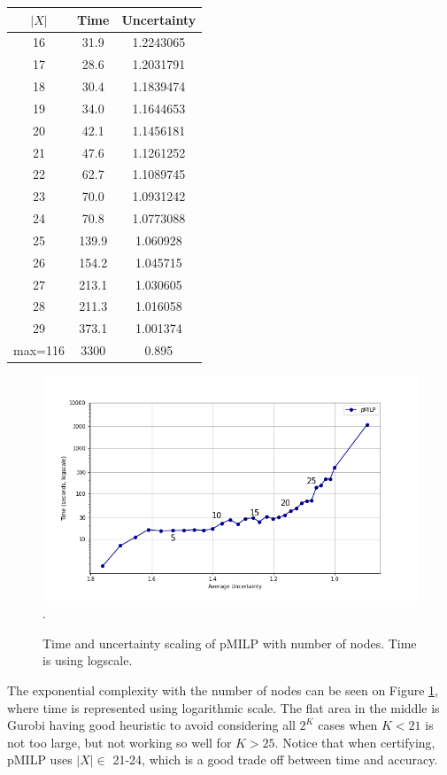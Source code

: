 \begin{table}[t!]
\begin{subtable}[b]{0.45\textwidth}
\begin{tabular}{|c|c|c|}
			\hline
			$|X|$ & Time & Uncertainty\\ 
		\hline	16 & 31.9 & 1.2243065\\
		\hline	17 & 28.6 & 1.2031791\\
		\hline	18 & 30.4 & 1.1839474\\
		\hline	19 & 34.0 & 1.1644653\\
		\hline	20 & 42.1 & 1.1456181\\
		\hline	21 & 47.6 & 1.1261252\\
		\hline	22 & 62.7 & 1.1089745\\
		\hline	23 & 70.0 & 1.0931242\\
		\hline	24 & 70.8 & 1.0773088\\
		\hline	25 & 139.9 & 1.060928\\
		\hline	26 & 154.2 & 1.045715\\
		\hline	27 & 213.1 & 1.030605 \\
		\hline	28 & 211.3 & 1.016058\\
		\hline	29 & 373.1 & 1.001374\\
		\hline max=116 & 3300 & 0.895\\ 
		\hline		
	  \end{tabular}
     \end{subtable}
    	\label{table14}
\end{table}


\begin{figure}[h!]
	\vspace*{-0.8cm}
	\includegraphics[scale=0.6]{Layer3_comparison}.
	\caption{Time and uncertainty scaling of pMILP with number of nodes.
	Time is using logscale.}
	\label{fig3}
\end{figure}



The exponential complexity with the number of nodes can be seen on Figure \ref{fig3}, where time is represented using logarithmic scale. The flat area in the middle is Gurobi having good heuristic to avoid considering all $2^K$ cases when $K<21$ is not too large, but not working so well for $K>25$. Notice that when certifying, pMILP uses $|X| \in$ 21-24, which is a good trade off between time and accuracy.


